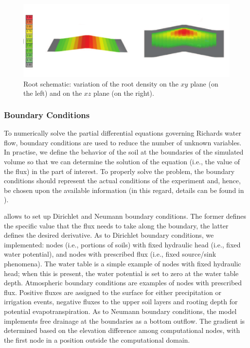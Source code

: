 \begin{figure}[t]
\includegraphics[scale=0.6]{chapters/physics-aware/orchard/img/root.pdf}
\caption{Root schematic: variation of the root density on the $xy$ plane (on the left) and on the $xz$ plane (on the right).}
\label{orchard-fig:root}
\end{figure}


\subsubsection{Boundary Conditions}
\label{orchard-sec:boundary}
To numerically solve the partial differential equations governing Richards water flow, boundary conditions are used to reduce the number of unknown variables.
In practise, we define the behavior of the soil at the boundaries of the simulated volume so that we can determine the solution of the equation (i.e., the value of the flux) in the part of interest.
To properly solve the problem, the boundary conditions should represent the actual conditions of the experiment and, hence, be chosen upon the available information (in this regard, details can be found in \cite{bittelli-etal-2015}). 

\olab{} allows to set up Dirichlet and Neumann boundary conditions.
The former defines the specific value that the flux needs to take along the boundary, the latter defines the desired derivative.
As to Dirichlet boundary conditions, we implemented: nodes (i.e., portions of soils) with fixed hydraulic head (i.e., fixed water potential), and nodes with prescribed flux (i.e., fixed source/sink phenomena). 
The water table is a simple example of nodes with fixed hydraulic head; when this is present, the water potential is set to zero at the water table depth. 
Atmospheric boundary conditions are examples of nodes with prescribed flux.
Positive fluxes are assigned to the surface for either precipitation or irrigation events, negative fluxes to the upper soil layers and rooting depth for potential evapotranspiration.
As to Neumann boundary conditions, the model implements free drainage at the boundaries as a bottom outflow.
The gradient is determined based on the elevation difference among computational nodes,
with the first node in a position outside the computational domain. 

